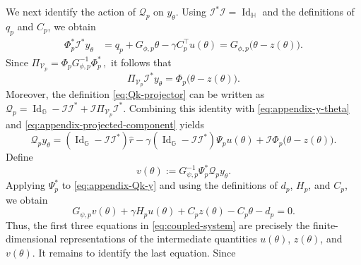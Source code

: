 \documentclass{article}
\theoremstyle{definition}
\theoremstyle{remark}
\theoremstyle{plain}
\def\eqsp{\,}
\newcommand{\dsieve}{p}
\numberwithin{equation}{section}
\begin{document}
We next identify the action of \(\mathcal Q_\dsieve\) on \(y_\theta\). Using
\(\mathcal I^\ast\mathcal I=\operatorname{Id}_{\mathbb H}\) and the definitions of
\(q_\dsieve\) and \(C_\dsieve\), we obtain
\begin{align}
    \Phi_\dsieve^\ast\mathcal I^\ast y_\theta
    &=
    q_\dsieve
    +
    G_{\phi,\dsieve}\theta
    -
    \gamma C_\dsieve^\top u(\theta)
    \nonumber=
    G_{\phi,\dsieve}\bigl(\theta-z(\theta)\bigr).
\label{eq:appendix-projected-Istar-y}
\end{align}
Since
\(
    \Pi_{\mathcal V_\dsieve}
    =
    \Phi_\dsieve G_{\phi,\dsieve}^{-1}\Phi_\dsieve^\ast\eqsp,
\)
it follows that
\begin{equation}
\label{eq:appendix-projected-component}
    \Pi_{\mathcal V_\dsieve}\mathcal I^\ast y_\theta
    =
    \Phi_\dsieve\bigl(\theta-z(\theta)\bigr).
\end{equation}
Moreover, the definition \eqref{eq:Qk-projector} can be written as
\(
    \mathcal Q_\dsieve
    =
    \operatorname{Id}_{\mathbb G}
    -
    \mathcal I\mathcal I^\ast
    +
    \mathcal I\Pi_{\mathcal V_\dsieve}\mathcal I^\ast.
\)
Combining this identity with \eqref{eq:appendix-y-theta} and
\eqref{eq:appendix-projected-component} yields
\begin{equation}
\label{eq:appendix-Qk-y}
    \mathcal Q_\dsieve y_\theta
    =
    (\operatorname{Id}_{\mathbb G}-\mathcal I\mathcal I^\ast)\widehat r
    -
    \gamma
    (\operatorname{Id}_{\mathbb G}-\mathcal I\mathcal I^\ast)
    \Psi_\dsieve u(\theta)
    +
    \mathcal I\Phi_\dsieve\bigl(\theta-z(\theta)\bigr).
\end{equation}
Define
\begin{equation}
\label{eq:appendix-v-definition}
    v(\theta)
    :=
    G_{\psi,\dsieve}^{-1}
    \Psi_\dsieve^\ast\mathcal Q_\dsieve y_\theta.
\end{equation}
Applying \(\Psi_\dsieve^\ast\) to \eqref{eq:appendix-Qk-y} and using the definitions
of \(d_\dsieve\), \(H_\dsieve\), and \(C_\dsieve\), we obtain
\begin{equation}
\label{eq:appendix-v-equation}
    G_{\psi,\dsieve}v(\theta)
    +
    \gamma H_\dsieve u(\theta)
    +
    C_\dsieve z(\theta)
    -
    C_\dsieve\theta
    -
    d_\dsieve
    =
    0.
\end{equation}
Thus, the first three equations in \eqref{eq:coupled-system} are precisely the
finite-dimensional representations of the intermediate quantities
\(u(\theta)\), \(z(\theta)\), and \(v(\theta)\).
It remains to identify the last equation. Since
\end{document}
